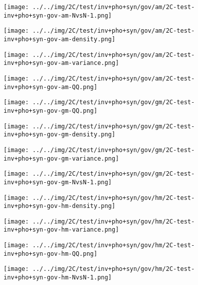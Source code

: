 \begin{figure}[H]
\centering	\texttt{[image: ../../img/2C/test/inv+pho+syn/gov/am/2C-test-inv+pho+syn-gov-am-NvsN-1.png]}
\end{figure}
\begin{figure}[H]
\centering	\texttt{[image: ../../img/2C/test/inv+pho+syn/gov/am/2C-test-inv+pho+syn-gov-am-density.png]}
\end{figure}
\begin{figure}[H]
\centering	\texttt{[image: ../../img/2C/test/inv+pho+syn/gov/am/2C-test-inv+pho+syn-gov-am-variance.png]}
\end{figure}
\begin{figure}[H]
\centering	\texttt{[image: ../../img/2C/test/inv+pho+syn/gov/am/2C-test-inv+pho+syn-gov-am-QQ.png]}
\end{figure}
\begin{figure}[H]
\centering	\texttt{[image: ../../img/2C/test/inv+pho+syn/gov/gm/2C-test-inv+pho+syn-gov-gm-QQ.png]}
\end{figure}
\begin{figure}[H]
\centering	\texttt{[image: ../../img/2C/test/inv+pho+syn/gov/gm/2C-test-inv+pho+syn-gov-gm-density.png]}
\end{figure}
\begin{figure}[H]
\centering	\texttt{[image: ../../img/2C/test/inv+pho+syn/gov/gm/2C-test-inv+pho+syn-gov-gm-variance.png]}
\end{figure}
\begin{figure}[H]
\centering	\texttt{[image: ../../img/2C/test/inv+pho+syn/gov/gm/2C-test-inv+pho+syn-gov-gm-NvsN-1.png]}
\end{figure}
\begin{figure}[H]
\centering	\texttt{[image: ../../img/2C/test/inv+pho+syn/gov/hm/2C-test-inv+pho+syn-gov-hm-density.png]}
\end{figure}
\begin{figure}[H]
\centering	\texttt{[image: ../../img/2C/test/inv+pho+syn/gov/hm/2C-test-inv+pho+syn-gov-hm-variance.png]}
\end{figure}
\begin{figure}[H]
\centering	\texttt{[image: ../../img/2C/test/inv+pho+syn/gov/hm/2C-test-inv+pho+syn-gov-hm-QQ.png]}
\end{figure}
\begin{figure}[H]
\centering	\texttt{[image: ../../img/2C/test/inv+pho+syn/gov/hm/2C-test-inv+pho+syn-gov-hm-NvsN-1.png]}
\end{figure}
